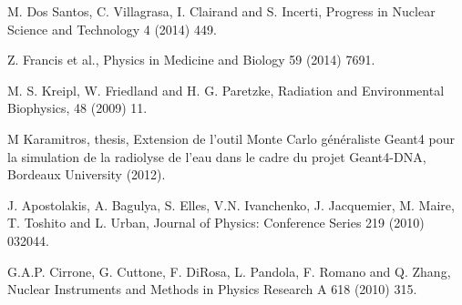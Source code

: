 
 M. Dos Santos, C. Villagrasa, I. Clairand and S. Incerti,
                        Progress in Nuclear Science and Technology 4 (2014) 449.

 Z. Francis et al., 
                        Physics in Medicine and Biology 59 (2014) 7691.


 M. S. Kreipl, W. Friedland and H. G. Paretzke, 
                                Radiation and Environmental Biophysics, 48 (2009) 11.

 M Karamitros, thesis, Extension de l'outil Monte Carlo g{\'e}n{\'e}raliste
                           Geant4 pour la simulation de la radiolyse de l'eau dans le cadre du projet 
                           Geant4-DNA,
                           Bordeaux University (2012).

J. Apostolakis, A. Bagulya, S. Elles, V.N. Ivanchenko, J. Jacquemier,
                     M. Maire, T. Toshito and L. Urban,
                     Journal of Physics: Conference Series 219 (2010) 032044.

 G.A.P. Cirrone, G. Cuttone, F. DiRosa, L. Pandola, F. Romano and Q. Zhang,
                       Nuclear Instruments and Methods in Physics Research A 618 (2010) 315.

